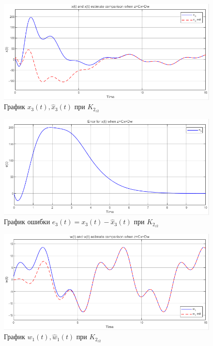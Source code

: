 \documentclass[a4paper, 12pt]{article}
\begin{document}
    \begin{figure}[H]
        \centering
        \includegraphics[scale=0.75]{3task_xxh3cd.png}
        \captionsetup{skip=0pt}
        \caption{График $x_3(t),\hat{x}_3(t)$ при $K_{2_{z2}}$}
        \label{fig:3task_xxh3cd}
    \end{figure}
    \begin{figure}[H]
        \centering
        \includegraphics[scale=0.75]{3task_xe3cd.png}
        \captionsetup{skip=0pt}
        \caption{График ошибки $e_3(t)=x_3(t)-\hat{x}_3(t)$ при $K_{2_{z2}}$}
        \label{fig:3task_xe3cd}
    \end{figure}
    \begin{figure}[H]
        \centering
        \includegraphics[scale=0.75]{3task_wwh1cd.png}
        \captionsetup{skip=0pt}
        \caption{График $w_1(t),\hat{w}_1(t)$ при $K_{2_{z2}}$}
        \label{fig:3task_wwh1cd}
    \end{figure}
\end{document}

